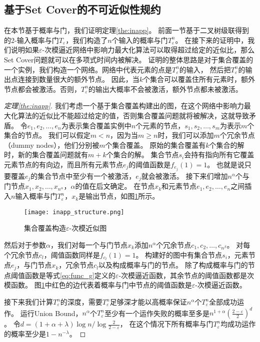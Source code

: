 \subsection{基于Set Cover的不可近似性规约}
在本节基于概率与门，我们证明定理\ref{the:inapp}。
前面一节基于二叉树级联得到的2-输入概率与门$T_\varepsilon$，我们构造了$n$个输入的概率与门$T_\varepsilon^n$。
在接下来的证明中，我们说明如果$\varepsilon$-次模逼近网络中影响力最大化算法可以取得超过给定的近似比，那么Set Cover问题就可以在多项式时间内被解决。
证明的整体思路是对于集合覆盖的一个实例，我们构造一个网络。网络中代表元素的点是$T_\varepsilon^n$的输入，
然后把$T_\varepsilon^n$的输出点连接到数量很大的额外节点。
因此，当$k$个集合可以覆盖住所有元素时，额外节点都会被激活。否则，$T_\varepsilon^n$的输出大概率不会被激活，额外节点都未被激活。
\begin{proof}[定理\ref{the:inapp}]
我们考虑一个基于集合覆盖构建出的图，在这个网络中影响力最大化算法的近似比不能超过给定的值，否则集合覆盖问题就将被解决，这就导致矛盾。
令$e_1, e_2, \dots, e_n$为表示集合覆盖实例中$n$个元素的节点，$s_1, s_2, \dots, s_m$为表示$m$个集合的节点。
我们可以假定$m<n$，因为当$m\geq n$时，我们可以添加$m$个冗余节点（dummy nodes），他们分别被$m$个集合覆盖。
原始的集合覆盖有$k$个集合的解时，新的集合覆盖问题就有$m+k$个集合的解。
集合节点$s_i$会持有指向所有它覆盖元素节点的有向边，而且所有元素节点$e_j$的阈值函数是$f_{e_j}(1)=1$。
也就是说只要覆盖$e_j$的集合节点中至少有一个被激活，$e_j$就会被激活。
接下来们增加$n^\alpha$个与门节点$x_1, x_2, \dots, x_{n^\alpha}$，$\alpha$的值在后文确定。
在节点$x_k$和元素节点$e_1, e_2, \dots, e_n$之间插入$n$输入概率与门$T_\varepsilon^n$，$x_k$是输出节点，如图\ref{fig:inapp_structure}所示。
\begin{figure}[h]
	\centering
	\texttt{[image: inapp\_structure.png]}
	\caption{集合覆盖构造$\varepsilon$-次模近似图}\label{fig:inapp_structure}
\end{figure}
然后对于参数$\alpha$，我们对每一个与门节点$x_k$添加$n^\alpha$个冗余节点$c_1, c_2, \dots, c_{n^\beta}$。
对每个冗余节点$c_l$，阈值函数同样是$f_{c_l}(1)=1$。
构建好的图中有集合节点$s_i$，元素节点$e_j$，与门节点$x_k$，冗余节点$c_l$以及构成概率与门的节点。
除了构成概率与门的节点阈值函数是等式\ref{eq:func_g}定义的$\varepsilon$-次模逼近函数，其余节点的阈值函数都是次模函数。
图\ref{fig:inapp_structure}中红色的边代表着概率与门中节点的阈值函数是$\varepsilon$-次模逼近函数。

接下来我们计算$T_\varepsilon^n$的深度，需要$T_\varepsilon^n$足够深才能以高概率保证$n^\alpha$个$T_\varepsilon^n$全部成功运作。
运行Union Bound，$n^\alpha$个$T_\varepsilon^n$至少有一个运作失败的概率至多是$n^{1+\alpha}(\frac{2-\varepsilon}{2})^{d}$。
令$d = (1+\alpha+\lambda)\log n / \log{\frac{2}{2-\varepsilon}}$，
在这个情况下所有概率与门$T_\varepsilon^n$均成功运作的概率至少是$1-n^{-\lambda}$。


\end{proof}
